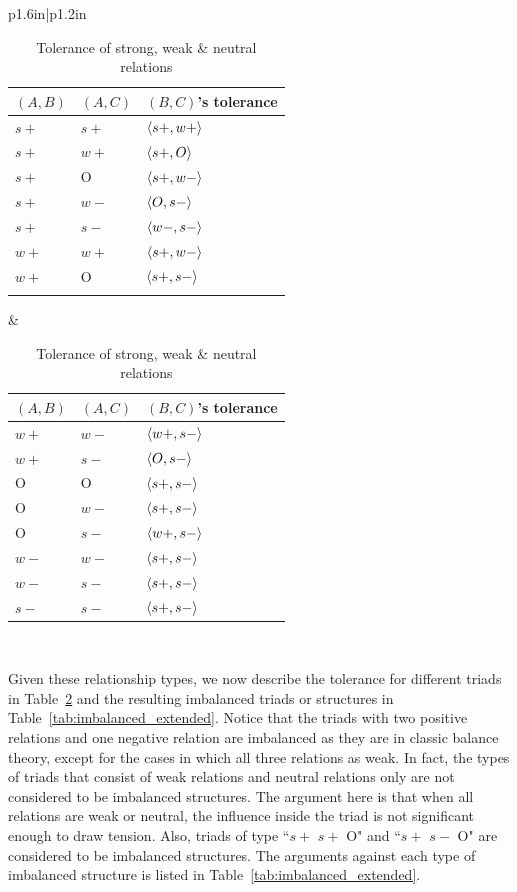 \begin{table}[htbp!]
\begin{tabular}{p{1.6in}|p{1.2in}}
 \begin{tabular}{p{0.3in}p{0.3in}p{0.5in}} 
$(A,B)$ & $(A,C)$ & $(B,C)$'s tolerance \\ \hline
$s+$ & $s+$ & $\langle s+,w+\rangle$ \\
$s+$ & $w+$ & $\langle s+,O\rangle$  \\
$s+$ & O & $\langle s+,w-\rangle$ \\
$s+$ & $w-$ & $\langle O,s-\rangle$ \\ 
$s+$ & $s-$ &   $\langle w-,s-\rangle$ \\
$w+$ & $w+$ & $\langle s+,w-\rangle$ \\
$w+$ & O & $\langle s+,s-\rangle$ \\
& & 
\end{tabular} &
\begin{tabular}{p{0.3in}p{0.3in}p{0.5in}} 
$(A,B)$ & $(A,C)$ & $(B,C)$'s tolerance \\ \hline
$w+$ & $w-$ & $\langle w+,s-\rangle$ \\
$w+$ & $s-$ & $\langle O,s-\rangle$ \\ 
O & O & $\langle s+,s-\rangle$ \\ 
O & $w-$ & $\langle s+,s-\rangle$ \\ 
O & $s-$ &  $\langle w+,s-\rangle$ \\ 
$w-$ & $w-$ & $\langle s+,s-\rangle$ \\ 
$w-$ & $s-$ & $\langle s+,s-\rangle$ \\ 
$s-$ & $s-$ & $\langle s+,s-\rangle$ \\
\end{tabular}
\end{tabular} \\\vspace{1mm} 
\caption{\label{tab:weak_strong_tolerance} Tolerance of strong, weak \& neutral relations}
\end{table}

Given these relationship types, we now describe the tolerance for
different triads in Table~\ref{tab:weak_strong_tolerance} and the
resulting imbalanced triads or structures in
Table~\ref{tab:imbalanced_extended}. Notice that the triads with
two positive relations and one negative relation are imbalanced as
they are in classic balance theory, except for the cases in which all
three relations as weak. In fact, the types of triads that consist
of weak relations and neutral relations only are not considered to be
imbalanced structures. The argument here is that when all relations
are weak or neutral, the influence inside the triad is not significant
enough to draw tension. Also, triads of type ``$s+$ $s+$ O" and
``$s+$ $s-$ O" are considered to be imbalanced structures. The
arguments against each type of imbalanced structure is listed in
Table~\ref{tab:imbalanced_extended}.

